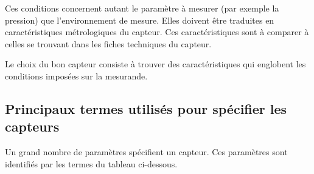 Ces conditions concernent autant le paramètre à mesurer (par exemple la pression) que l'environnement de mesure. Elles doivent être traduites en caractéristiques métrologiques du capteur. Ces caractéristiques sont à comparer à celles se trouvant dans les fiches techniques du capteur.

Le choix du bon capteur consiste à trouver des caractéristiques qui englobent les conditions imposées sur la mesurande.

\subsection{Principaux termes utilisés pour spécifier les capteurs}

Un grand nombre de paramètres spécifient un capteur. Ces paramètres sont identifiés par les termes du tableau ci-dessous.
